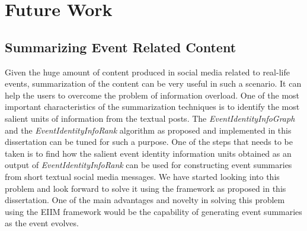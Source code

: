 %


\section{Future Work}

\subsection{Summarizing Event Related Content}
Given the huge amount of content produced in social media related to real-life events, summarization of the content can be very useful in such a scenario. It can help the users to overcome the problem of information overload. One of the most important characteristics of the summarization techniques is to identify the most salient units of information from the textual posts. The \textit{EventIdentityInfoGraph} and the \textit{EventIdentityInfoRank} algorithm as proposed and implemented in this dissertation can be tuned for such a purpose. One of the steps that needs to be taken is to find how the salient event identity information units obtained as an output of \textit{EventIdentityInfoRank} can be used for constructing event summaries from short textual social media messages. We have started looking into this problem and look forward to solve it using the framework as proposed in this dissertation. One of the main advantages and novelty in solving this problem using the EIIM framework would be the capability of generating event summaries as the event evolves. 

